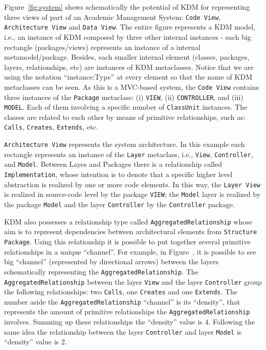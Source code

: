 Figure~\ref{fig:system} shows schematically the potential of KDM for representing three views of part of an Academic Management System: \texttt{Code View}, \texttt{Architecture View} and \texttt{Data View}. The entire figure represents a KDM model, i.e., an instance of KDM composed by three other internal instances - each big rectangle (packages/views) represents an instance of a internal metamodel/package. Besides, each smaller internal element (classes, packages, layers, relationships, etc) are instances of KDM metaclasses. Notice that we are using the notation ``instance:Type'' at every element so that the name of KDM metaclasses can be seen.
As this is a MVC-based system, the \texttt{Code View} contains three instances of the \texttt{Package} metaclass: (i) \texttt{VIEW}, (ii) \texttt{CONTROLLER}, and (iii) \texttt{MODEL}. Each of them involving a specific number of \texttt{ClassUnit} instances. The classes are related to each other by means of primitive relationships, such as: \texttt{Calls}, \texttt{Creates}, \texttt{Extends}, etc.

\texttt{Architecture View} represents the system architecture. In this example each rectangle represents an instance of the \texttt{Layer} metaclass, i.e., \texttt{View}, \texttt{Controller}, and \texttt{Model}. Between Layes and Packages there is a relationship called \texttt{Implementation}, whose intention is to denote that a specific higher level abstraction is realized by one or more code elements. In this way, the \texttt{Layer View} is realized in source-code level by the package \texttt{VIEW}; the \texttt{Model} layer is realized by the package \texttt{Model} and the layer \texttt{Controller} by the \texttt{Controller} package.



KDM also possesses a relationship type called \texttt{AggregatedRelationship} whose aim is to represent dependencies between architectural elements from \texttt{Structure Package}. Using this relationship it is possible to put together several primitive relationships in a unique ``channel''. For example, in Figure~\cite{fig:system}, it is possible to see big ``channel'' (represented by directional arrows) between the layers schematically representing the \texttt{AggregatedRelationship}. The \texttt{AggregatedRelationship} between the layer \texttt{View} and the layer \texttt{Controller} group the following relationships: two \texttt{Calls}, one \texttt{Creates} and one \texttt{Extends}. The number aside the \texttt{AggregatedRelationship} ``channel'' is its ``density'', that represents the amount of primitive relationships the \texttt{AggregatedRelationship} involves. Summing up these relationships the ``density'' value is 4. Following the same idea the relationship between the layer \texttt{Controller} and layer \texttt{Model} is ``density'' value is 2. %


